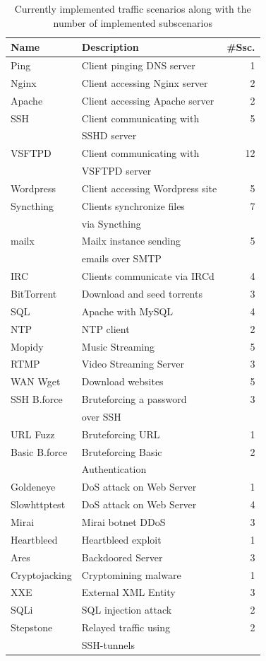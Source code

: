 \documentclass[sigconf]{acmart}
\begin{document}
\begin{table}
\begin{tabular}{l|l|r}
 \hline
 Name & Description & \#Ssc. \\
 \hline
 Ping & Client pinging DNS server & 1 \\
 Nginx & Client accessing Nginx server & 2\\
 Apache & Client accessing Apache server & 2\\
 SSH & Client communicating with & 5\\
 &SSHD server&\\
 VSFTPD & Client communicating with & 12\\
 &VSFTPD server&\\
 Wordpress & Client accessing Wordpress site & 5\\
 Syncthing& Clients synchronize files & 7\\
 &via Syncthing&\\
 mailx& Mailx instance sending & 5\\
 &emails over SMTP &\\
 IRC & Clients communicate via IRCd& 4\\
 BitTorrent & Download and seed torrents & 3 \\
 SQL & Apache with MySQL & 4\\
 NTP & NTP client & 2\\
 Mopidy & Music Streaming & 5\\
 RTMP & Video Streaming Server & 3\\
 WAN Wget & Download websites & 5 \\
 \hline
 SSH B.force & Bruteforcing a password & 3\\
 &over SSH&\\
 URL Fuzz & Bruteforcing URL & 1\\
 Basic B.force & Bruteforcing Basic & 2\\
 &Authentication&\\
 Goldeneye & DoS attack on Web Server & 1\\
 Slowhttptest & DoS attack on Web Server & 4 \\
 Mirai & Mirai botnet DDoS & 3\\
 Heartbleed & Heartbleed exploit & 1\\
 Ares & Backdoored Server & 3\\
 Cryptojacking & Cryptomining malware & 1\\
 XXE & External XML Entity & 3\\
 SQLi & SQL injection attack & 2 \\
 Stepstone & Relayed traffic using & 2\\
 &SSH-tunnels&\\
 \hline
\end{tabular}
\caption{Currently implemented traffic scenarios along with the number of implemented subscenarios}
\label{tab:scen}
\end{table}
\end{document}
